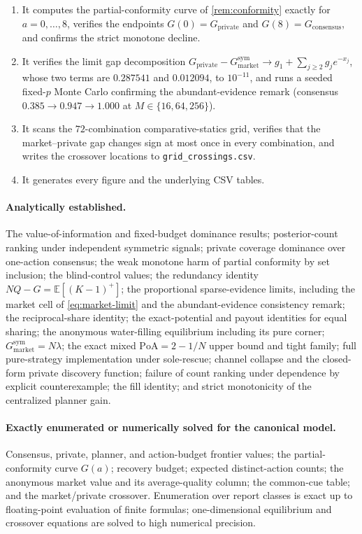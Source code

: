 \documentclass[11pt]{article}
\theoremstyle{definition}
\theoremstyle{remark}
\newcommand{\E}{\mathbb{E}}
\newcommand{\1}{\mathbf{1}}
\newcommand{\priv}{\mathrm{private}}
\newcommand{\cons}{\mathrm{consensus}}
\newcommand{\mkt}{\mathrm{market}}
\newcommand{\PoA}{\mathrm{PoA}}
\begin{document}
\begin{enumerate}
\item It computes the partial-conformity curve of \cref{rem:conformity} exactly for $a=0,\ldots,8$, verifies the endpoints $G(0)=G_{\priv}$ and $G(8)=G_{\cons}$, and confirms the strict monotone decline.
\item It verifies the limit gap decomposition $G_{\priv}-G_{\mkt}^{\mathrm{sym}}\to g_1+\sum_{j\ge2}g_je^{-x_j}$, whose two terms are $0.287541$ and $0.012094$, to $10^{-11}$, and runs a seeded fixed-$p$ Monte Carlo confirming the abundant-evidence remark (consensus $0.385\to0.947\to1.000$ at $M\in\{16,64,256\}$).
\item It scans the $72$-combination comparative-statics grid, verifies that the market--private gap changes sign at most once in every combination, and writes the crossover locations to \texttt{grid\_crossings.csv}.
\item It generates every figure and the underlying CSV tables.
\end{enumerate}

\paragraph{Analytically established.}
The value-of-information and fixed-budget dominance results; posterior-count ranking under independent symmetric signals; private coverage dominance over one-action consensus; the weak monotone harm of partial conformity by set inclusion; the blind-control values; the redundancy identity $NQ-G=\E[(K-1)^{+}]$; the proportional sparse-evidence limits, including the market cell of \cref{eq:market-limit} and the abundant-evidence consistency remark; the reciprocal-share identity; the exact-potential and payout identities for equal sharing; the anonymous water-filling equilibrium including its pure corner; $G_{\mkt}^{\mathrm{sym}}=N\lambda$; the exact mixed $\PoA=2-1/N$ upper bound and tight family; full pure-strategy implementation under sole-rescue; channel collapse and the closed-form private discovery function; failure of count ranking under dependence by explicit counterexample; the fill identity; and strict monotonicity of the centralized planner gain.

\paragraph{Exactly enumerated or numerically solved for the canonical model.}
Consensus, private, planner, and action-budget frontier values; the partial-conformity curve $G(a)$; recovery budget; expected distinct-action counts; the anonymous market value and its average-quality column; the common-cue table; and the market/private crossover. Enumeration over report classes is exact up to floating-point evaluation of finite formulas; one-dimensional equilibrium and crossover equations are solved to high numerical precision.
\end{document}

